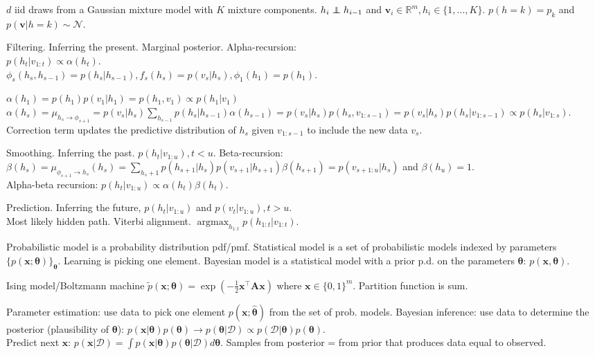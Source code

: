 \documentclass[twocolumn]{article}
\DeclareMathOperator*{\argmax}{argmax}
\newcommand\ind{\protect\mathpalette{\protect\independenT}{\perp}}
\def\independenT#1#2{\mathrel{\rlap{$#1#2$}\mkern2mu{#1#2}}}
\begin{document}
$d$ iid draws from a Gaussian mixture model with $K$ mixture components. $h_i\ind h_{i-1}$ and $\mathbf{v}_i\in\mathbb{R}^m, h_i\in\{1,...,K\}$. $p(h=k)=p_k$ and $p(\mathbf{v}|h=k)\sim\mathcal{N}$.

\newpage

Filtering. Inferring the present. Marginal posterior. Alpha-recursion:\\
$p(h_t|v_{1:t})\propto\alpha(h_t)$.\\
$\phi_s(h_s,h_{s-1})=p(h_s|h_{s-1}), f_s(h_s)=p(v_s|h_s), \phi_1(h_1)=p(h_1)$.

$\alpha(h_1)=p(h_1)p(v_1|h_1)=p(h_1,v_1)\propto p(h_1|v_1)$\\
$\alpha(h_s)=\mu_{h_s\to\phi_{s+1}}=p(v_s|h_s)\sum_{h_{s-1}}p(h_s|h_{s-1})\alpha(h_{s-1})=p(v_s|h_s)p(h_s,v_{1:s-1})=p(v_s|h_s)p(h_s|v_{1:s-1})\propto p(h_s|v_{1:s})$. Correction term updates the predictive distribution of $h_s$ given $v_{1:s-1}$ to include the new data $v_s$.

Smoothing. Inferring the past. $p(h_t|v_{1:u}), t<u$. Beta-recursion:\\
$\beta(h_s)=\mu_{\phi_{s+1}\to h_s}(h_s)=\sum_{h_s+1}p(h_{s+1}|h_s)p(v_{s+1}|h_{s+1})\beta(h_{s+1})=p(v_{s+1:u}|h_s)$ and $\beta(h_u)=1$.\\
Alpha-beta recursion: $p(h_t|v_{1:u})\propto\alpha(h_t)\beta(h_t)$.

Prediction. Inferring the future, $p(h_t|v_{1:u})$ and $p(v_t|v_{1:u}), t>u$.\\
Most likely hidden path. Viterbi alignment. $\argmax_{h_{1:t}}p(h_{1:t}|v_{1:t})$.

Probabilistic model is a probability distribution pdf/pmf. Statistical model is a set of probabilistic models indexed by parameters $\{p({\bm{x}};\bm{\theta})\}_{\bm{\theta}}$. Learning is picking one element. Bayesian model is a statistical model with a prior p.d. on the parameters $\bm{\theta}$: $p(\bm{x},\bm{\theta})$.

Ising model/Boltzmann machine $\tilde{p}(\bm{x};\bm{\theta})=\exp(-\frac{1}{2}\bm{x}^\top\bm{A}\bm{x})$ where $\bm{x}\in\{0,1\}^m$. Partition function is sum. 

Parameter estimation: use data to pick one element $p(\bm{x};\bm{\hat{\theta}})$ from the set of prob. models. Bayesian inference: use data to determine the posterior (plausibility of $\bm{\theta}$): $p(\bm{x}|\bm{\theta})p(\bm{\theta})\to p(\bm{\theta}|\mathcal{D})\propto p(\mathcal{D}|\bm{\theta})p(\bm{\theta})$.\\
Predict next $\bm{x}$: $p(\bm{x}|\mathcal{D})=\int p(\bm{x}|\bm{\theta})p(\bm{\theta}|\mathcal{D})d\bm{\theta}$. Samples from posterior = from prior that produces data equal to observed.
\end{document}
